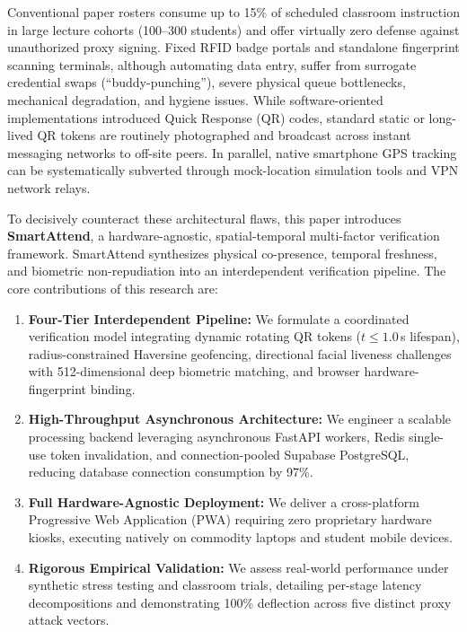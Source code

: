 \documentclass[conference]{IEEEtran}
\begin{document}
Conventional paper rosters consume up to 15\% of scheduled classroom instruction in large lecture cohorts (100--300 students) and offer virtually zero defense against unauthorized proxy signing. Fixed RFID badge portals and standalone fingerprint scanning terminals, although automating data entry, suffer from surrogate credential swaps (``buddy-punching''), severe physical queue bottlenecks, mechanical degradation, and hygiene issues. While software-oriented implementations introduced Quick Response (QR) codes, standard static or long-lived QR tokens are routinely photographed and broadcast across instant messaging networks to off-site peers. In parallel, native smartphone GPS tracking can be systematically subverted through mock-location simulation tools and VPN network relays.

To decisively counteract these architectural flaws, this paper introduces \textbf{SmartAttend}, a hardware-agnostic, spatial-temporal multi-factor verification framework. SmartAttend synthesizes physical co-presence, temporal freshness, and biometric non-repudiation into an interdependent verification pipeline. The core contributions of this research are:
\begin{enumerate}
    \item \textbf{Four-Tier Interdependent Pipeline:} We formulate a coordinated verification model integrating dynamic rotating QR tokens ($t \le 1.0$\,s lifespan), radius-constrained Haversine geofencing, directional facial liveness challenges with 512-dimensional deep biometric matching, and browser hardware-fingerprint binding.
    \item \textbf{High-Throughput Asynchronous Architecture:} We engineer a scalable processing backend leveraging asynchronous FastAPI workers, Redis single-use token invalidation, and connection-pooled Supabase PostgreSQL, reducing database connection consumption by 97\%.
    \item \textbf{Full Hardware-Agnostic Deployment:} We deliver a cross-platform Progressive Web Application (PWA) requiring zero proprietary hardware kiosks, executing natively on commodity laptops and student mobile devices.
    \item \textbf{Rigorous Empirical Validation:} We assess real-world performance under synthetic stress testing and classroom trials, detailing per-stage latency decompositions and demonstrating 100\% deflection across five distinct proxy attack vectors.
\end{enumerate}
\end{document}
